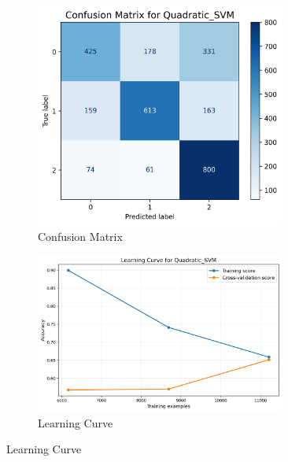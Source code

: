 \documentclass[10pt]{article}
\begin{document}
    \begin{figure}[!ht]
        \begin{subfigure}{0.5\textwidth}
            \centering
            \includegraphics[width=0.9\textwidth]{code/ResultsMainAugZip/plots/Block4_SVM_Variants_Experiment_I/confusion_matrix_Quadratic_SVM.png}
            \caption{Confusion Matrix}
        \end{subfigure}
        \begin{subfigure}{0.5\textwidth}
            \centering
            \includegraphics[width=0.9\textwidth]{code/ResultsMainAugZip/plots/Block4_SVM_Variants_Experiment_I/learning_curve_Quadratic_SVM.png}
            \caption{Learning Curve}
        \end{subfigure}
    \end{figure}
    
\end{document}
